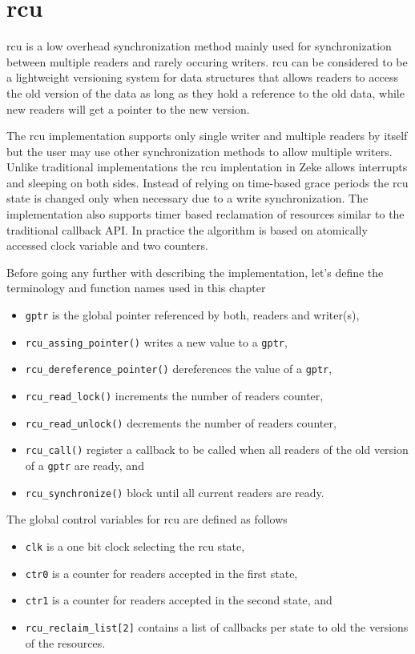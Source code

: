 \chapter{\acf{rcu}}

\acf{rcu} is a low overhead synchronization method mainly used for
synchronization between multiple readers and rarely occuring writers.
\acs{rcu} can be considered to be a lightweight versioning system for
data structures that allows readers to access the old version of the
data as long as they hold a reference to the old data, while new
readers will get a pointer to the new version.

The \acs{rcu} implementation supports only single writer and multiple
readers by itself but the user may use other synchronization methods to
allow multiple writers. Unlike traditional implementations the \acs{rcu}
implentation in Zeke allows interrupts and sleeping on both sides.
Instead of relying on time-based grace periods the \acs{rcu} state is
changed only when necessary due to a write synchronization. The
implementation also supports timer based reclamation of resources similar
to the traditional callback API. In practice the algorithm is based on
atomically accessed clock variable and two counters.

Before going any further with describing the implementation, let's define the
terminology and function names used in this chapter

\begin{itemize}
  \item \verb+gptr+ is the global pointer referenced by both, readers and writer(s),
  \item \verb+rcu_assing_pointer()+ writes a new value to a \verb+gptr+,
  \item \verb+rcu_dereference_pointer()+ dereferences the value of a \verb+gptr+,
  \item \verb+rcu_read_lock()+ increments the number of readers counter,
  \item \verb+rcu_read_unlock()+ decrements the number of readers counter,
  \item \verb+rcu_call()+ register a callback to be called when all readers of the
        old version of a \verb+gptr+ are ready, and
  \item \verb+rcu_synchronize()+ block until all current readers are ready.
\end{itemize}

The global control variables for \acs{rcu} are defined as follows
\begin{itemize}
  \item \verb+clk+ is a one bit clock selecting the \acs{rcu} state,
  \item \verb+ctr0+ is a counter for readers accepted in the first state,
  \item \verb+ctr1+ is a counter for readers accepted in the second state, and
  \item \verb+rcu_reclaim_list[2]+ contains a list of callbacks per state to
        old the versions of the resources.
\end{itemize}


